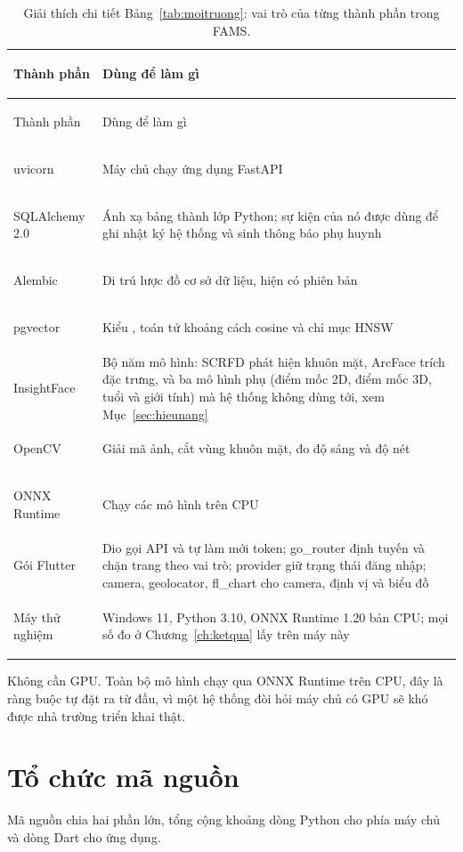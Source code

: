 {\small
\begin{xltabular}{\textwidth}{@{}>{\bfseries\raggedright\arraybackslash\leavevmode}p{3.4cm} >{\raggedright\arraybackslash\leavevmode}X@{}}
\caption{Giải thích chi tiết Bảng~\ref{tab:moitruong}: vai trò của từng thành phần trong FAMS.}
\label{tab:moitruong-gt}\\
\toprule
Thành phần & Dùng để làm gì \\
\midrule
\endfirsthead
\toprule
Thành phần & Dùng để làm gì \\
\midrule
\endhead
\bottomrule
\endfoot
uvicorn & Máy chủ chạy ứng dụng FastAPI \\
SQLAlchemy 2.0 & Ánh xạ bảng thành lớp Python; sự kiện của nó được dùng để ghi nhật ký hệ thống và sinh thông báo phụ huynh \\
Alembic & Di trú lược đồ cơ sở dữ liệu, hiện có \FsoMigration{} phiên bản \\
pgvector & Kiểu , toán tử khoảng cách cosine và chỉ mục HNSW \\
InsightFace  & Bộ năm mô hình: SCRFD phát hiện khuôn mặt, ArcFace trích đặc trưng, và ba mô hình phụ (điểm mốc 2D, điểm mốc 3D, tuổi và giới tính) mà hệ thống không dùng tới, xem Mục~\ref{sec:hieunang} \\
OpenCV & Giải mã ảnh, cắt vùng khuôn mặt, đo độ sáng và độ nét \\
ONNX Runtime & Chạy các mô hình trên CPU \\
Gói Flutter & Dio gọi API và tự làm mới token; go\_router định tuyến và chặn trang theo vai trò; provider giữ trạng thái đăng nhập; camera, geolocator, fl\_chart cho camera, định vị và biểu đồ \\
Máy thử nghiệm & Windows 11, Python 3.10, ONNX Runtime 1.20 bản CPU; mọi số đo ở Chương~\ref{ch:ketqua} lấy trên máy này \\
\end{xltabular}}

Không cần GPU. Toàn bộ mô hình chạy qua ONNX Runtime trên CPU, đây là ràng
buộc tự đặt ra từ đầu, vì một hệ thống đòi hỏi máy chủ có GPU sẽ khó được
nhà trường triển khai thật.

\section{Tổ chức mã nguồn}

Mã nguồn chia hai phần lớn, tổng cộng khoảng \FsoDongPython{} dòng Python
cho phía máy chủ và \FsoDongDart{} dòng Dart cho ứng dụng.

